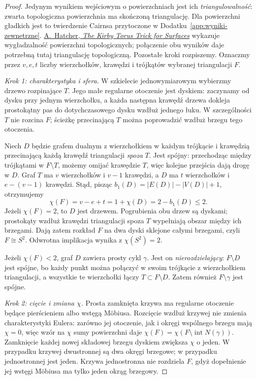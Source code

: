 \begin{proof}
Jedynym wynikiem wejściowym o powierzchniach
jest ich \emph{triangulowalność}: zwarta
topologiczna powierzchnia ma skończoną
triangulację. Dla powierzchni gładkich jest
to twierdzenie Cairnsa przytoczone w
Dodatku~\ref{app:wyniki-zewnetrzne}.
\href{https://pi.math.cornell.edu/~hatcher/Papers/TorusTrick.pdf}
{A.\ Hatcher, \emph{The Kirby Torus Trick for Surfaces}}
wykazuje wygładzalność powierzchni topologicznych;
połączenie obu wyników daje potrzebną tutaj
triangulację topologiczną.
Pozostałe kroki rozpiszemy. Oznaczmy przez
$v,e,t$ liczby wierzchołków, krawędzi
i trójkątów wybranej triangulacji $F$.

\emph{Krok 1: charakterystyka i sfera.}
W szkielecie jednowymiarowym wybierzmy
drzewo rozpinające $T$. Jego małe regularne
otoczenie jest dyskiem: zaczynamy od dysku
przy jednym wierzchołku, a każda następna
krawędź drzewa dokleja prostokątny pas
do dotychczasowego dysku wzdłuż jednego łuku.
W szczególności $T$ nie rozcina $F$;
ścieżkę przecinającą $T$ można poprowadzić
wzdłuż brzegu tego otoczenia.

Niech $D$ będzie grafem dualnym z wierzchołkiem
w każdym trójkącie i krawędzią przecinającą
każdą krawędź triangulacji \emph{spoza} $T$.
Jest spójny: przechodząc między trójkątami
w $F\setminus T$, możemy omijać krawędzie
$T$, więc kolejne przejścia dają drogę w $D$.
Graf $T$ ma $v$ wierzchołków i $v-1$ krawędzi,
a $D$ ma $t$ wierzchołków i $e-(v-1)$ krawędzi.
Stąd, pisząc $b_1(D)=|E(D)|-|V(D)|+1$,
otrzymujemy
\[
 \chi(F)=v-e+t=1+\chi(D)=2-b_1(D)\leq 2.
\]
Jeżeli $\chi(F)=2$, to $D$ jest drzewem.
Pogrubienia obu drzew są dyskami;
prostokąty wzdłuż krawędzi triangulacji
spoza $T$ wypełniają obszar między ich
brzegami. Dają zatem rozkład $F$ na dwa
dyski sklejone całymi brzegami, czyli
$F\cong S^2$. Odwrotna implikacja wynika
z $\chi(S^2)=2$.

Jeżeli $\chi(F)<2$, graf $D$ zawiera prosty
cykl $\gamma$. Jest on \emph{nierozdzielający}:
$F\setminus D$ jest spójne, bo każdy punkt
można połączyć w swoim trójkącie z wierzchołkiem
triangulacji, a wszystkie te wierzchołki łączy
$T\subset F\setminus D$. Zatem również
$F\setminus\gamma$ jest spójne.

\emph{Krok 2: cięcie i zmiana $\chi$.}
Prosta zamknięta krzywa ma regularne otoczenie
będące pierścieniem albo wstęgą Möbiusa.
Rozcięcie wzdłuż krzywej nie zmienia
charakterystyki Eulera: zarówno jej
otoczenie, jak i okręgi wspólnego brzegu
mają $\chi=0$, więc wzór na $\chi$ sumy
powierzchni daje $\chi(F)=\chi(F\setminus
\operatorname{int}N(\gamma))$.
Zamknięcie każdej nowej składowej brzegu
dyskiem zwiększa $\chi$ o jeden.
W przypadku krzywej dwustronnej są dwa
okręgi brzegowe; w przypadku jednostronnej
jest jeden. Krzywa jednostronna nie rozdziela
$F$, gdyż dopełnienie jej wstęgi Möbiusa
ma tylko jeden okrąg brzegowy.


\end{proof}
